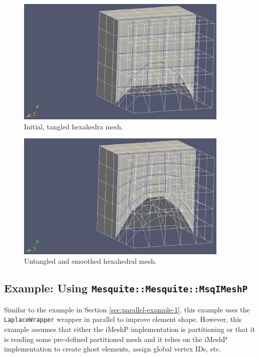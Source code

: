 \begin{figure}[htpb]
\begin{center}
\includegraphics[width=4in]{par-hex-orig.eps}
\caption{Initial, tangled hexahedra mesh.}
\label{fig:par_hex_orig}
\end{center}
\end{figure}

\begin{figure}[htpb]
\begin{center}
\includegraphics[width=4in]{par-hex-smoothed.eps}
\caption{Untangled and smoothed hexahedral mesh.}
\label{fig:par_hex_smoothed}
\end{center}
\end{figure}

\subsection{Example: Using \texttt{Mesquite::Mesquite::MsqIMeshP}}

Similar to the example in Section \ref{sec:parallel-example-1}, this example uses the \texttt{LaplaceWrapper} wrapper in parallel to improve element shape.  However, this example assumes that either the iMeshP implementation is partitioning or that it is reading some pre-defined partitioned mesh and it relies on the iMeshP implementation to create ghost elements, assign global vertex IDs, etc.  

